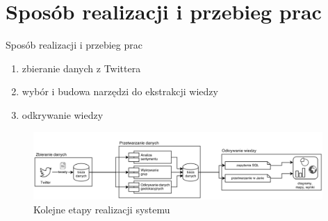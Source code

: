 \documentclass[xcolor=table]{beamer}
\begin{document}
\section{Sposób realizacji i przebieg prac}
\begin{frame}{Sposób realizacji i przebieg prac}
\begin{enumerate}
  \item zbieranie danych z Twittera
  
  \item wybór i budowa narzędzi do ekstrakcji wiedzy
  
  \item odkrywanie wiedzy
  
\end{enumerate}

\begin{figure}[ht!]
\centering
\includegraphics[width=11cm]{img/gruby-model.png}
\caption{Kolejne etapy realizacji systemu}
\end{figure}

\end{frame}

\end{document}
